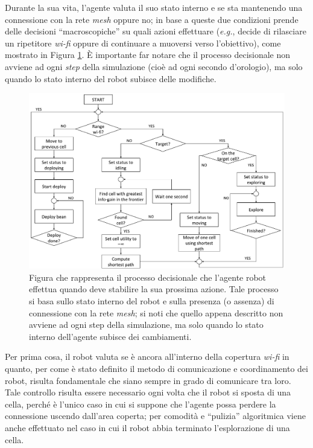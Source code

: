 Durante la sua vita, l'agente valuta il suo stato interno e se sta mantenendo una connessione con la rete \textit{mesh} oppure no; in base a queste due condizioni prende delle decisioni “macroscopiche” su quali azioni effettuare (\textit{e.g.}, decide di rilasciare un ripetitore \textit{wi-fi} oppure di continuare a muoversi verso l'obiettivo), come mostrato in Figura \ref{fig:robotworkflow}.
È importante far notare che il processo decisionale non avviene ad ogni \textit{step} della simulazione (cioè ad ogni secondo d'orologio), ma solo quando lo stato interno del robot subisce delle modifiche.
\begin{figure}
	\centering
	\includegraphics[width=1.0\linewidth]{images/Robot_workflow}
	\caption{Figura che rappresenta il processo decisionale che l'agente robot effettua quando deve stabilire la sua prossima azione. Tale processo si basa sullo stato interno del robot e sulla presenza (o assenza) di connessione con la rete \textit{mesh}; si noti che quello appena descritto non avviene ad ogni step della simulazione, ma solo quando lo stato interno dell'agente subisce dei cambiamenti.}
	\label{fig:robotworkflow}
\end{figure}
Per prima cosa, il robot valuta se è ancora all'interno della copertura \textit{wi-fi} in quanto, per come è stato definito il metodo di comunicazione e coordinamento dei robot, risulta fondamentale che siano sempre in grado di comunicare tra loro.
Tale controllo risulta essere necessario ogni volta che il robot si sposta di una cella, perché è l'unico caso in cui si suppone che l'agente possa perdere la connessione uscendo dall'area coperta; per comodità e “pulizia” algoritmica viene anche effettuato nel caso in cui il robot abbia terminato l'esplorazione di una cella.
